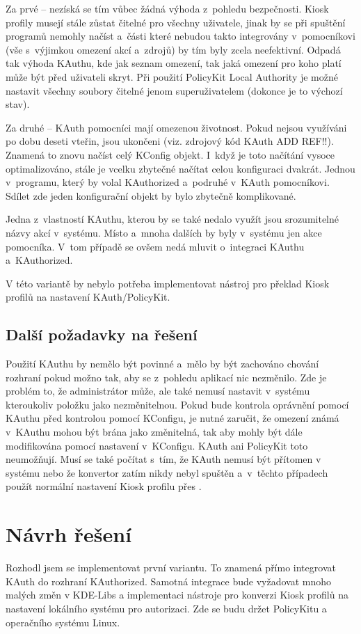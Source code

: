Za prvé -- nezíská se tím vůbec žádná výhoda z~pohledu bezpečnosti. Kiosk profily musejí stále zůstat čitelné pro všechny uživatele, jinak by se při spuštění programů nemohly načíst a~části které nebudou takto integrovány v~pomocníkovi (vše s~výjimkou omezení akcí a~zdrojů) by tím byly zcela neefektivní. Odpadá tak výhoda KAuthu, kde jak seznam omezení, tak jaká omezení pro koho platí může být před uživateli skryt. Při použití PolicyKit Local Authority je možné nastavit všechny soubory čitelné jenom superuživatelem (dokonce je to výchozí stav).

Za druhé -- KAuth pomocníci mají omezenou životnost. Pokud nejsou využíváni po dobu deseti vteřin, jsou ukončeni (viz. zdrojový kód KAuth ADD REF!!). Znamená to znovu načíst celý KConfig objekt. I~když je toto načítání vysoce optimalizováno, stále je vcelku zbytečné načítat celou konfiguraci dvakrát. Jednou v~programu, který by volal KAuthorized a~podruhé v~KAuth pomocníkovi. Sdílet zde jeden konfigurační objekt by bylo zbytečně komplikované.

Jedna z~vlastností KAuthu, kterou by se také nedalo využít jsou srozumitelné názvy akcí v~systému. Místo  a~mnoha dalších by byly v~systému jen akce pomocníka. V~tom případě se ovšem nedá mluvit o~integraci KAuthu a~KAuthorized.

V této variantě by nebylo potřeba implementovat nástroj pro překlad Kiosk profilů na nastavení KAuth/PolicyKit.

\subsection*{Další požadavky na řešení}
Použití KAuthu by nemělo být povinné a~mělo by být zachováno chování rozhraní  pokud možno tak, aby se z~pohledu aplikací nic nezměnilo. Zde je problém to, že administrátor může, ale také nemusí nastavit v~systému  kteroukoliv položku jako nezměnitelnou. Pokud bude kontrola oprávnění pomocí KAuthu před kontrolou pomocí KConfigu, je nutné zaručit, že omezení známá v~KAuthu mohou být brána jako změnitelná, tak aby mohly být dále modifikována pomocí nastavení v~KConfigu. KAuth ani PolicyKit toto neumožňují. Musí se také počítat s~tím, že KAuth nemusí být přítomen v systému nebo že konvertor zatím nikdy nebyl spuštěn a~v~těchto případech použít normální nastavení Kiosk profilu přes .

\section{Návrh řešení}\label{mozres}
Rozhodl jsem se implementovat první variantu. To znamená přímo integrovat KAuth do rozhraní KAuthorized. Samotná integrace bude vyžadovat mnoho malých změn v KDE-Libs a implementaci nástroje pro konverzi Kiosk profilů na nastavení lokálního systému pro autorizaci. Zde se budu držet PolicyKitu a operačního systému Linux.

